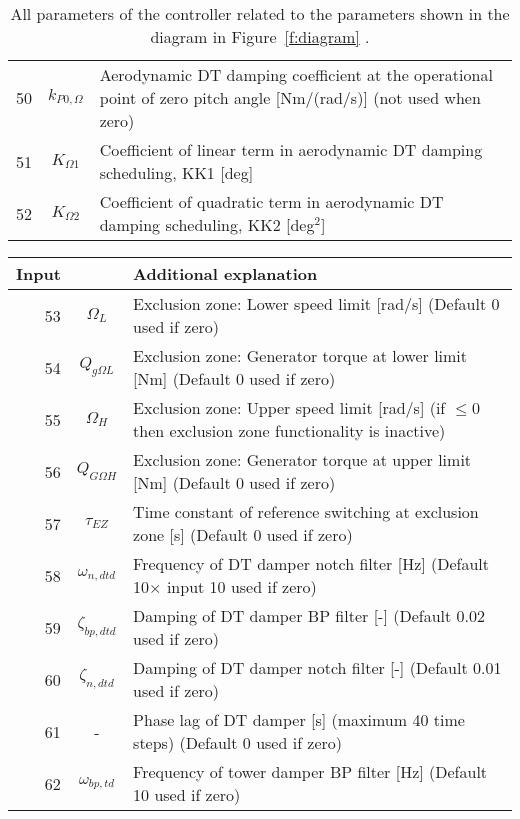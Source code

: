 \begin{table}[t!]
\begin{center}
\begin{tabular}{r|c|p{11.5cm}}
\hline
50 &  	$k_{P0,\Omega}$	& Aerodynamic DT damping coefficient at the operational point of zero pitch angle [Nm/(rad/s)] (not used when zero)\\
51 &  	$K_{\Omega 1}$	& Coefficient of linear term in aerodynamic DT damping scheduling, KK1 [deg] \\
52 &	$K_{\Omega 2}$	& Coefficient of quadratic term in aerodynamic DT damping scheduling, KK2 [deg${}^2$] \\
\end{tabular}
\caption{All parameters of the controller related to the parameters shown in the diagram in Figure~\ref{f:diagram} . \label{t:par}}
\end{center}
\end{table}




\begin{table}[t!]
\begin{center}
\begin{tabular}{r|c|p{11.5cm}}
Input &  			& Additional explanation  \\ \hline
 53   &	  $\Omega_L$	    & Exclusion zone: Lower speed limit [rad/s]              (Default 0 used if zero)\\ 
 54   &  $Q_{g\Omega L}$	& Exclusion zone: Generator torque at lower limit [Nm]   (Default 0 used if zero)\\ 
 55   &  $\Omega_H$ 	    & Exclusion zone: Upper speed limit [rad/s] (if $\le 0$ then exclusion zone functionality is inactive)\\ 
 56   &  $Q_{G\Omega H}$& Exclusion zone: Generator torque at upper limit [Nm]     (Default 0 used if zero)\\ 
 57   &	  $\tau_{EZ}$	& Time constant of reference switching at exclusion zone [s] (Default 0 used if zero)\\   
\hline
 58  & $\omega_{n,dtd}$ 	& Frequency of DT damper notch filter [Hz]                  (Default 10$\times$ input 10 used if zero)\\ 
 59  & $\zeta_{bp,dtd}$	& Damping of DT damper BP filter [-]                          (Default 0.02 used if zero)\\ 
 60  & $\zeta_{n,dtd}$	& Damping of DT damper notch filter [-]                       (Default 0.01 used if zero)\\ 
 61  & - 			& Phase lag of DT damper [s] (maximum 40 time steps)                    (Default 0 used if zero) \\ 
\hline
 62  & $\omega_{bp, td}$	& Frequency of tower damper BP filter [Hz]                   (Default 10 used if zero)\\ 

\end{tabular}
\end{center}
\end{table}
